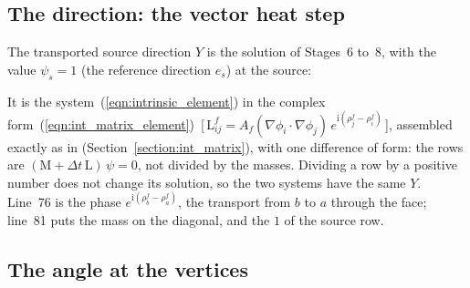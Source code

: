 \subsection{The direction: the vector heat step}

The transported source direction $Y$ is the solution of Stages~6 to~8, with the value $\psi_s = 1$ (the reference direction $e_s$) at the source:

It is the system~(\ref{eqn:intrinsic_element}) in the complex form~(\ref{eqn:int_matrix_element})~[\,$\mathrm L^f_{ij} = A_f(\nabla\phi_i\cdot\nabla\phi_j)\, e^{\mathrm i(\rho_j^f - \rho_i^f)}$\,], assembled exactly as in  (Section~\ref{section:int_matrix}), with one difference of form: the rows are $(\mathrm M + \Delta t\,\mathrm L)\,\psi = 0$, not divided by the masses. Dividing a row by a positive number does not change its solution, so the two systems have the same $Y$. Line~76 is the phase $e^{\mathrm i(\rho_b^f - \rho_a^f)}$, the transport from $b$ to $a$ through the face; line~81 puts the mass on the diagonal, and the $1$ of the source row.

\subsection{The angle at the vertices}


